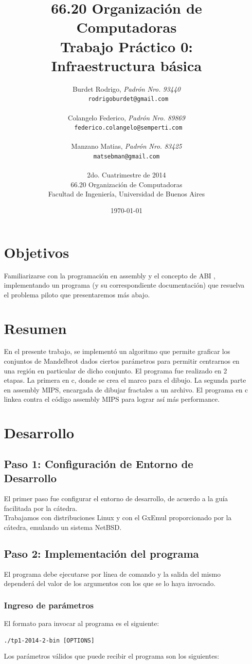 \documentclass[a4paper,10pt,oneside]{article}
\title{\textbf{66.20 Organización de Computadoras\\ Trabajo Práctico 0: \\ Infraestructura básica}}
\author{	Burdet Rodrigo, \textit{Padrón Nro. 93440}\\
            \texttt{ rodrigoburdet@gmail.com}\\\\
            Colangelo Federico, \textit{Padrón Nro. 89869}                     \\
            \texttt{ federico.colangelo@semperti.com}\\\\
            Manzano Matias, \textit{Padrón Nro. 83425}                     \\
            \texttt{ matsebman@gmail.com }\\\\[2.5ex]
            \normalsize{2do. Cuatrimestre de 2014}                       \\
			\normalsize{66.20 Organización de Computadoras}\\
            \normalsize{Facultad de Ingeniería, Universidad de Buenos Aires}            \\
       }
\date{\today}
\begin{document}
\maketitle

\thispagestyle{empty}

\newpage

\section{Objetivos}
    Familiarizarse con la programación en assembly y el concepto de ABI
, implementando un programa (y su correspondiente documentación) que resuelva el problema piloto que presentaremos más abajo.
\section{Resumen}
	En el presente trabajo, se implementó un algoritmo que permite graficar los conjuntos de Mandelbrot dados ciertos parámetros para permitir centrarnos en una región en particular de dicho conjunto.
	El programa fue realizado en 2 etapas. La primera en c, donde se crea el marco para el dibujo. La segunda parte en assembly MIPS, encargada de dibujar  fractales a un archivo. El programa en c linkea contra el código assembly MIPS para lograr así más performance.

\section{Desarrollo}
	
\subsection{Paso 1: Configuración de Entorno de Desarrollo}
El primer paso fue configurar el entorno de desarrollo, de acuerdo a la guía facilitada por la cátedra. \\
Trabajamos con distribuciones Linux y con el GxEmul proporcionado por la cátedra, emulando un sistema NetBSD.	
\subsection{Paso 2: Implementación del programa}
El programa debe ejecutarse por línea de comando y la salida del mismo dependerá del valor de los argumentos con los que se lo haya invocado.
\subsubsection{Ingreso de parámetros}
El formato para invocar al programa es el siguiente:
\begin{center}
	\texttt{./tp1-2014-2-bin [OPTIONS]}
\end{center}
Los parámetros válidos que puede recibir el programa son los siguientes: \\ 
\end{document}
